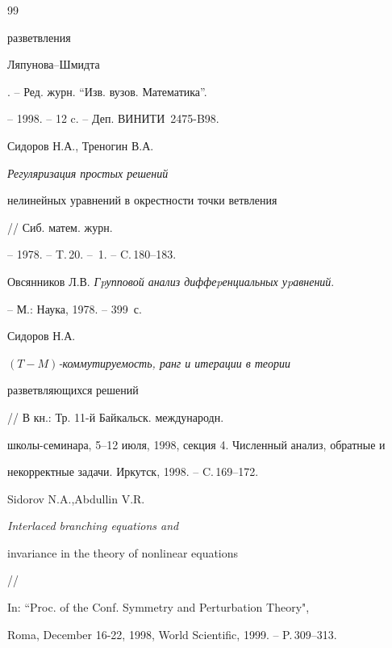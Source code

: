 \begin{thebibliography}{99}
{разветвления


Ляпунова--Шмидта}. -- Ред. журн. ``Изв. вузов. Математика''.


-- 1998. -- 12 c. -- Деп. ВИНИТИ \No\,2475-B98.




Сидоров Н.А., Треногин В.А. {\em Регуляризация простых решений


нелинейных уравнений в окрестности точки ветвления} // Сиб. матем. журн.


-- 1978. -- T.\,20. -- \No\,1. -- C.\,180--183.




Овсянников Л.В. {\em Гpупповой анализ диффеpенциальных уpавнений}.


-- М.: Наука, 1978. -- 399~с.




Сидоров Н.А. {\em $(T-M)$-коммутируемость, ранг и итерации в теории


разветвляющихся решений} // В кн.: Тр. 11-й Байкальск. международн.


школы-семинара, 5--12 июля, 1998, секция 4. Численный анализ, обратные и


некорректные задачи. Иркутск, 1998. -- C.\,169--172.




Sidorov N.A.,Abdullin V.R. {\em Interlaced branching equations and


invariance in the theory of nonlinear equations} //


In: ``Proc. of the Conf. Symmetry and Perturbation Theory",


Roma, December 16-22, 1998, World Scientific, 1999. -- P.\,309--313.





\end{thebibliography}





\vskip 2cm












\label{end}





